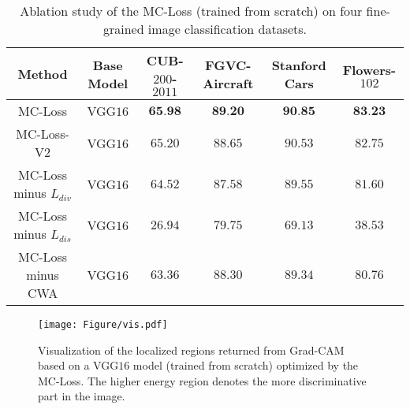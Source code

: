 \documentclass[journal]{IEEEtran}
\begin{document}
\begin{table*}[!t]
\begin{tabular}{|c|c|c|c|c|c|}
    \end{tabular}\label{tab:table_loss_function}\end{table*}


\begin{table*}[!t]
  \centering
  \caption{Ablation study of the MC-Loss (trained from scratch) on four fine-grained image classification datasets.}
  \small
\begin{tabular}{|c|c|c|c|c|c|}
    \hline
    Method                              & Base Model    & CUB-$200$-$2011$    & FGVC-Aircraft      & Stanford Cars       & Flowers-$102$ \\
    \hline
    \hline
    MC-Loss                             & VGG$16$       & $\textbf{65.98}$    & $\textbf{89.20}$   & $\textbf{90.85}$    & $\textbf{83.23}$ \\
    MC-Loss-V$2$                        & VGG$16$       & $65.20$             & $88.65$            & $90.53$             & $82.75$ \\
    MC-Loss minus $L_{div}$             & VGG$16$       & $64.52$             & $87.58$            & $89.55$             & $81.60$ \\
    MC-Loss minus $L_{dis}$             & VGG$16$       & $26.94$             & $79.75$            & $69.13$             & $38.53$ \\
MC-Loss minus CWA                   & VGG$16$       & $63.36$             & $88.30$            & $89.34$             & $80.76$  \\
    \hline
    \end{tabular}\label{tab:table_Ablation}\end{table*}










\begin{figure*}[!t]
    \tiny
    \begin{center}

\texttt{[image: Figure/vis.pdf]}

\end{center}
    \tiny
\caption{Visualization of the localized regions returned from Grad-CAM~\cite{selvaraju2017grad} based on a VGG$16$ model (trained from scratch) optimized by the MC-Loss. The higher energy region denotes the more discriminative part in the image.}
\label{fig:visualization_MC2}
\end{figure*}
\end{document}
